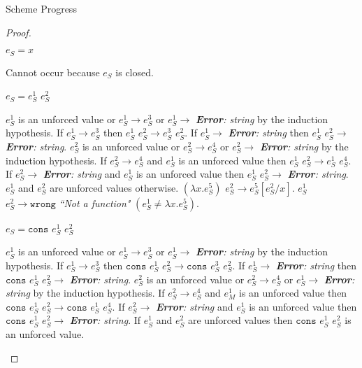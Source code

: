 \begin{theorem}{Scheme Progress}
\begin{proof}
\begin{case}
$e_{S}=x$

Cannot occur because $e_{S}$ is closed.

\end{case}


\begin{case}

$e_{S}=e_{S}^{1}$ $e_{S}^{2}$

$e_{S}^{1}$ is an unforced value or $e_{S}^{1}\rightarrow e_{S}^{3}$ or $e_{S}^{1}\rightarrow$ \emph{\textbf{Error}: string} by the induction hypothesis.  If $e_{S}^{1}\rightarrow e_{S}^{3}$ then $e_{S}^{1}$ $e_{S}^{2}\rightarrow e_{S}^{3}$ $e_{S}^{2}$.  If $e_{S}^{1}\rightarrow$ \emph{\textbf{Error}: string} then $e_{S}^{1}$ $e_{S}^{2}\rightarrow$ \emph{\textbf{Error}: string}.  $e_{S}^{2}$ is an unforced value or $e_{S}^{2}\rightarrow e_{S}^{4}$ or $e_{S}^{2}\rightarrow$ \emph{\textbf{Error}: string} by the induction hypothesis.  If $e_{S}^{2}\rightarrow e_{S}^{4}$ and $e_{S}^{1}$ is an unforced value then $e_{S}^{1}$ $e_{S}^{2}\rightarrow e_{S}^{1}$ $e_{S}^{4}$.  If $e_{S}^{2}\rightarrow$ \emph{\textbf{Error}: string} and $e_{S}^{1}$ is an unforced value then $e_{S}^{1}$ $e_{S}^{2}\rightarrow$ \emph{\textbf{Error}: string}.  $e_{S}^{1}$ and $e_{S}^{2}$ are unforced values otherwise.  $(\lambda x.e_{S}^{5})$ $e_{S}^{2}\rightarrow e_{S}^{5}[e_{S}^{2}/x]$.  $e_{S}^{1}$ $e_{S}^{2}\rightarrow\mathtt{wrong}$ \emph{``Not a function"} $(e_{S}^{1}\neq\lambda x.e_{S}^{5})$.

\end{case}


\begin{case}

$e_{S}=\mathtt{cons}$ $e_{S}^{1}$ $e_{S}^{2}$

$e_{S}^{1}$ is an unforced value or $e_{S}^{1}\rightarrow e_{S}^{3}$ or $e_{S}^{1}\rightarrow$ \emph{\textbf{Error}: string} by the induction hypothesis.  If $e_{S}^{1}\rightarrow e_{S}^{3}$ then $\mathtt{cons}$ $e_{S}^{1}$ $e_{S}^{2}\rightarrow\mathtt{cons}$ $e_{S}^{3}$ $e_{S}^{2}$.  If $e_{S}^{1}\rightarrow$ \emph{\textbf{Error}: string} then $\mathtt{cons}$ $e_{S}^{1}$ $e_{S}^{2}\rightarrow$ \emph{\textbf{Error}: string}.  $e_{S}^{2}$ is an unforced value or $e_{S}^{2}\rightarrow e_{S}^{4}$ or $e_{S}^{1}\rightarrow$ \emph{\textbf{Error}: string} by the induction hypothesis.  If $e_{S}^{2}\rightarrow e_{S}^{4}$ and $e_{M}^{1}$ is an unforced value then $\mathtt{cons}$ $e_{S}^{1}$ $e_{S}^{2}\rightarrow\mathtt{cons}$ $e_{S}^{1}$ $e_{S}^{4}$.  If $e_{S}^{2}\rightarrow$ \emph{\textbf{Error}: string} and $e_{S}^{1}$ is an unforced value then $\mathtt{cons}$ $e_{S}^{1}$ $e_{S}^{2}\rightarrow$ \emph{\textbf{Error}: string}.  If $e_{S}^{1}$ and $e_{S}^{2}$ are unforced values then $\mathtt{cons}$ $e_{S}^{1}$ $e_{S}^{2}$ is an unforced value.


\end{case}
\end{proof}
\end{theorem}
